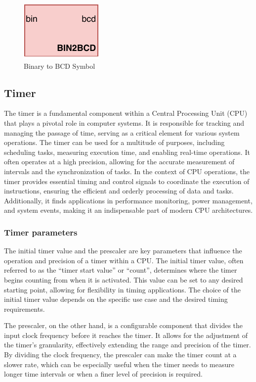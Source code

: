 \documentclass[12pt,a4paper,oneside]{book} %
\begin{document}
\begin{figure}[H]
    \centering
    \includegraphics[width=.3\textwidth]{images/bin2bcd_symbol.pdf}
    \caption{Binary to BCD Symbol}
\end{figure}

\subsection{Timer}
The timer is a fundamental component within a Central Processing Unit (CPU) that plays a pivotal role in computer systems. It is responsible for tracking and managing the passage of time, serving as a critical element for various system operations. The timer can be used for a multitude of purposes, including scheduling tasks, measuring execution time, and enabling real-time operations. It often operates at a high precision, allowing for the accurate measurement of intervals and the synchronization of tasks. In the context of CPU operations, the timer provides essential timing and control signals to coordinate the execution of instructions, ensuring the efficient and orderly processing of data and tasks. Additionally, it finds applications in performance monitoring, power management, and system events, making it an indispensable part of modern CPU architectures.

\subsubsection{Timer parameters}
The initial timer value and the prescaler are key parameters that influence the operation and precision of a timer within a CPU. The initial timer value, often referred to as the ``timer start value'' or ``count'', determines where the timer begins counting from when it is activated. This value can be set to any desired starting point, allowing for flexibility in timing applications. The choice of the initial timer value depends on the specific use case and the desired timing requirements.

The prescaler, on the other hand, is a configurable component that divides the input clock frequency before it reaches the timer. It allows for the adjustment of the timer's granularity, effectively extending the range and precision of the timer. By dividing the clock frequency, the prescaler can make the timer count at a slower rate, which can be especially useful when the timer needs to measure longer time intervals or when a finer level of precision is required.
\end{document}
